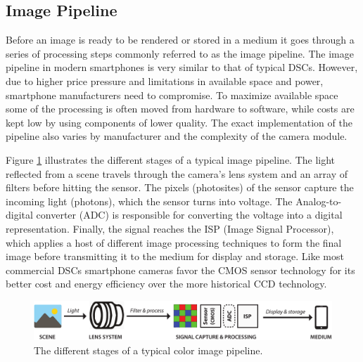 \documentclass[thesis.tex]{subfiles}
\begin{document}
\subsection{Image Pipeline}
Before an image is ready to be rendered or stored in a medium it goes through a series of processing steps commonly referred to as the image pipeline. The image pipeline in modern smartphones is very similar to that of typical DSCs. However, due to higher price pressure and limitations in available space and power, smartphone manufacturers need to compromise. To maximize available space some of the processing is often moved from hardware to software, while costs are kept low by using components of lower quality. The exact implementation of the pipeline also varies by manufacturer and the complexity of the camera module.

Figure \ref{figure:pipeline} illustrates the different stages of a typical image pipeline. The light reflected from a scene travels through the camera's lens system and an array of filters before hitting the sensor. The pixels (photosites) of the sensor capture the incoming light (photons), which the sensor turns into voltage. The Analog-to-digital converter (ADC) is responsible for converting the voltage into a digital representation. Finally, the signal reaches the ISP (Image Signal Processor), which applies a host of different image processing techniques to form the final image before transmitting it to the medium for display and storage. Like most commercial DSCs smartphone cameras favor the CMOS sensor technology for its better cost and energy efficiency over the more historical CCD technology.

\begin{figure}[ht]
\centering \includegraphics[width=\textwidth]{images/pipeline}
\caption{The different stages of a typical color image pipeline.\label{figure:pipeline}}
\end{figure}
\end{document}
